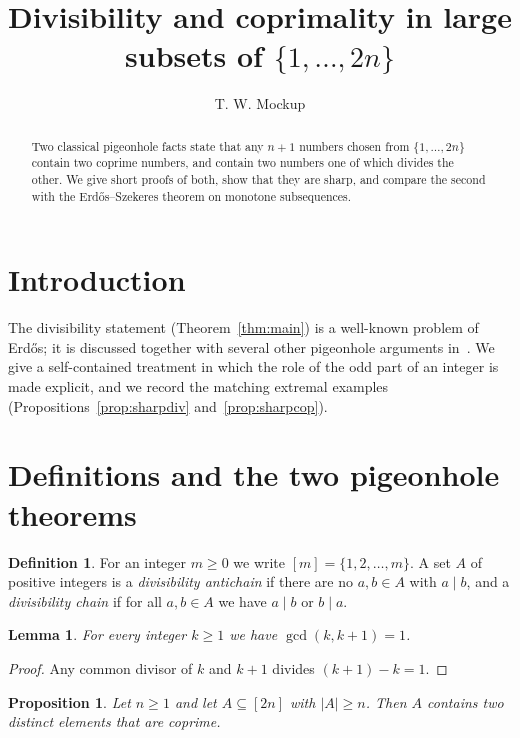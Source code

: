 \documentclass[11pt]{amsart}
\title{Divisibility and coprimality in large subsets of $\{1,\dots,2n\}$}
\author{T. W. Mockup}
\date{}
\newtheorem{lemma}[theorem]{Lemma}
\newtheorem{proposition}[theorem]{Proposition}
\theoremstyle{definition}
\newtheorem{definition}[theorem]{Definition}
\theoremstyle{remark}
\begin{document}
\begin{abstract}
Two classical pigeonhole facts state that any $n+1$ numbers chosen from
$\{1,\dots,2n\}$ contain two coprime numbers, and contain two numbers one of
which divides the other. We give short proofs of both, show that they are
sharp, and compare the second with the Erd\H{o}s--Szekeres theorem on
monotone subsequences.
\end{abstract}

\maketitle

\section{Introduction}

The divisibility statement (Theorem~\ref{thm:main}) is a well-known problem
of Erd\H{o}s; it is discussed together with several other pigeonhole
arguments in~\cite{AZ}. We give a self-contained treatment in which the role
of the odd part of an integer is made explicit, and we record the matching
extremal examples (Propositions~\ref{prop:sharpdiv} and~\ref{prop:sharpcop}).

\section{Definitions and the two pigeonhole theorems}

\begin{definition}\label{def:basic}
For an integer $m\ge 0$ we write $[m]=\{1,2,\dots,m\}$. A set $A$ of positive
integers is a \emph{divisibility antichain} if there are no $a,b\in A$ with
$a\mid b$, and a \emph{divisibility chain} if for all $a,b\in A$ we have
$a\mid b$ or $b\mid a$.
\end{definition}

\begin{lemma}\label{lem:consec}
For every integer $k\ge 1$ we have $\gcd(k,k+1)=1$.
\end{lemma}

\begin{proof}
Any common divisor of $k$ and $k+1$ divides $(k+1)-k=1$.
\end{proof}

\begin{proposition}\label{prop:coprime}
Let $n\ge 1$ and let $A\subseteq[2n]$ with $|A|\ge n$. Then $A$ contains two
distinct elements that are coprime.
\end{proposition}
\end{document}

